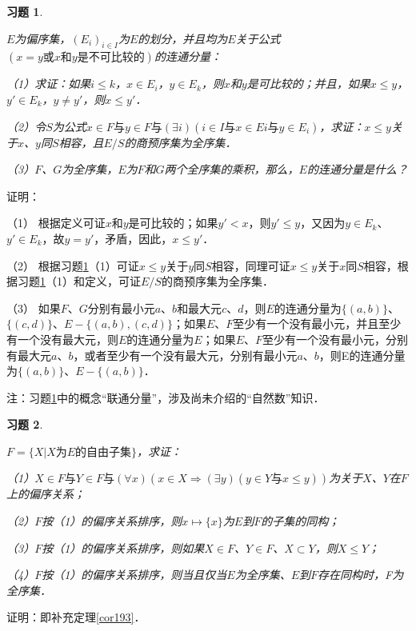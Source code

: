 \documentclass[12pt, a4paper, oneside]{book}
\newtheorem{exer}{习题}
\begin{document}
			\begin{exer}\label{exer80}
				\hfill\par
				$E$为偏序集，$(E_i)_{i\in I}$为$E$的划分，并且均为$E$关于公式$(x=y\text{或}x\text{和}y\text{是不可比较的})$的连通分量：
				\par
				（1）求证：如果$i\leq k$，$x\in E_i$，$y\in E_k$，则$x$和$y$是可比较的；并且，如果$x\leq y$，$y'\in E_k$，$y\neq y'$，则$x\leq y'$．
				\par
				（2）令$S$为公式$x\in F\text{与}y\in F\text{与}(\exists i)(i\in I\text{与}x\in Ei\text{与}y\in E_i)$，求证：$x\leq y$关于$x$、$y$同$S$相容，且$E/S$的商预序集为全序集．
				\par
				（3）$F$、$G$为全序集，$E$为$F$和$G$两个全序集的乘积，那么，$E$的连通分量是什么？
			\end{exer}
			证明：
			\par
			（1）	根据定义可证$x$和$y$是可比较的；如果$y'<x$，则$y'\leq y$，又因为$y\in E_k$、$y'\in E_k$，故$y=y'$，矛盾，因此，$x\leq y'$．
			\par
			（2）	根据习题\ref{exer80}（1）可证$x\leq y$关于$y$同$S$相容，同理可证$x\leq y$关于$x$同$S$相容，根据习题\ref{exer80}（1）和定义，可证$E/S$的商预序集为全序集．
			\par
			（3）	如果$F$、$G$分别有最小元$a$、$b$和最大元$c$、$d$，则$E$的连通分量为$\{(a,b)\}$、$\{(c, d)\}$、$E-\{(a, b), (c, d)\}$；如果$E$、$F$至少有一个没有最小元，并且至少有一个没有最大元，则$E$的连通分量为$E$；如果$E$、$F$至少有一个没有最小元，分别有最大元$a$、$b$，或者至少有一个没有最大元，分别有最小元$a$、$b$，则E的连通分量为$\{(a,b)\}$、$E-\{(a, b)\}$．
			\par
			注：习题\ref{exer80}中的概念“联通分量”，涉及尚未介绍的“自然数”知识．
			
			\begin{exer}\label{exer81}
				\hfill\par
				$F=\{X|X\text{为}E\text{的自由子集}\}$，求证：
				\par
				（1）$X\in F\text{与}Y\in F\text{与}(\forall x)(x\in X\Rightarrow (\exists y)(y\in Y\text{与}x\leq y))$为关于$X$、$Y$在$F$上的偏序关系；
				\par
				（2）$F$按（1）的偏序关系排序，则$x\mapsto \{x\}$为$E$到$F$的子集的同构；
				\par
				（3）$F$按（1）的偏序关系排序，则如果$X\in F$、$Y\in F$、$X\subset Y$，则$X\leq Y$；
				\par
				（4）$F$按（1）的偏序关系排序，则当且仅当$E$为全序集、$E$到$F$存在同构时，F为全序集．
			\end{exer}
			证明：即补充定理\ref{cor193}．
			
\end{document}
